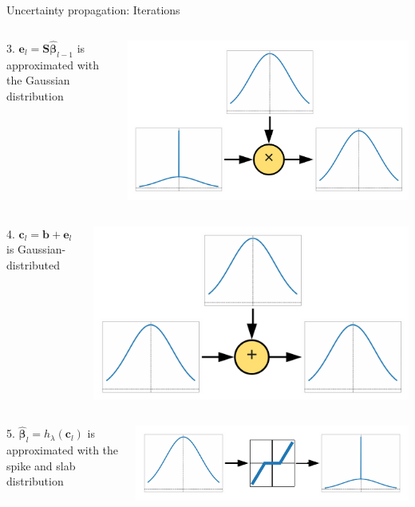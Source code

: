 \documentclass[9pt]{beamer}
\begin{document}
\begin{frame}{Uncertainty propagation: Iterations}
    \begin{columns}
      \begin{column}{0.33\textwidth}
      3. \(\mathbf{e}_l = \mathbf{S}\widehat{\boldsymbol\beta}_{l-1}\) is approximated with the Gaussian distribution
    \end{column}
    \begin{column}{0.67\textwidth}
        \includegraphics[width=0.6\columnwidth]{graphics/gauss_spsl.pdf}
      \end{column}
    \end{columns}
    \begin{columns}
      \begin{column}{0.33\textwidth}
      4. \(\mathbf{c}_l = \mathbf{b} + \mathbf{e}_l\) is Gaussian-distributed
    \end{column}
    \begin{column}{0.67\textwidth}
        \includegraphics[width=0.6\columnwidth]{graphics/gauss_gauss.pdf}
      \end{column}
    \end{columns}
    \begin{columns}
      \begin{column}{0.33\textwidth}
      5. \(\widehat{\boldsymbol\beta}_{l} = h_\lambda(\mathbf{c}_l)\) is approximated with the spike and slab distribution
    \end{column}
    \begin{column}{0.67\textwidth}
        \includegraphics[width=0.6\columnwidth]{graphics/spsl_propagation.pdf}
      \end{column}
    \end{columns}
\end{frame}
\end{document}
